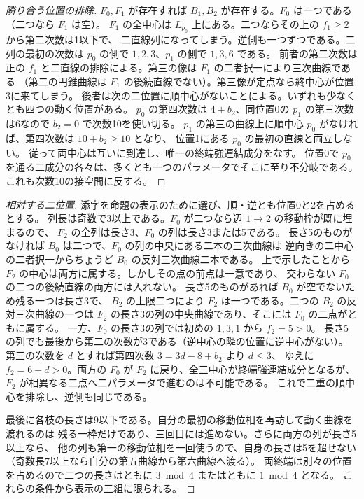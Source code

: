 \begin{proof}[隣り合う位置の排除]
$F_0,F_1$ が存在すれば $B_1,B_2$ が存在する。$F_0$ は一つである（二つなら $F_1$ は空）。
$F_1$ の全中心は $L_{p_0}$ 上にある。二つならその上の $f_1\ge2$ から第二次数は1以下で、
二直線列になってしまう。逆側も一つずつである。二列の最初の次数は
$p_0$ の側で $1,2,3$、$p_1$ の側で $1,3,6$ である。
前者の第二次数は正の $f_1$ と二直線の排除による。第三の像は $F_1$ の二者択一により三次曲線である
（第二の円錐曲線は $F_1$ の後続直線でない）。第三像が定点なら終中心が位置3に来てしまう。
後者は次の二位置に順中心がないことによる。いずれも少なくとも四つの動く位置がある。
$p_0$ の第四次数は $4+b_2$、同位置0の $p_1$ の第三次数は6なので $b_2=0$ で次数10を使い切る。
$p_1$ の第三の曲線上に順中心 $p_0$ がなければ、第四次数は $10+b_2\ge10$ となり、
位置1にある $p_0$ の最初の直線と両立しない。
従って両中心は互いに到達し、唯一の終端強連結成分をなす。
位置0で $p_0$ を通る二成分の各々は、多くとも一つのパラメータでそこに至り不分岐である。
これも次数10の接空間に反する。

\end{proof}
\begin{proof}[相対する二位置]
添字を命題の表示のために選び、順・逆とも位置0と2を占めるとする。
列長は奇数で3以上である。$F_0$ が二つなら辺 $1\to2$ の移動枠が既に埋まるので、
$F_2$ の全列は長さ3、$F_0$ の列は長さ3または5である。
長さ5のものがなければ $B_0$ は二つで、$F_0$ の列の中央にある二本の三次曲線は
逆向きの二中心の二者択一からちょうど $B_0$ の反対三次曲線二本である。
上で示したことから $F_2$ の中心は両方に属する。しかしその点の前点は一意であり、
交わらない $F_0$ の二つの後続直線の両方には入れない。
長さ5のものがあれば $B_0$ が空でないため残る一つは長さ3で、
$B_2$ の上限二つにより $F_2$ は一つである。二つの $B_2$ の反対三次曲線の一つは
$F_2$ の長さ3の列の中央曲線であり、そこには $F_0$ の二点がともに属する。
一方、$F_0$ の長さ3の列では初めの $1,3,1$ から $f_2=5>0$。
長さ5の列でも最後から第二の次数が3である（逆中心の隣の位置に逆中心がない）。
第三の次数を $d$ とすれば第四次数 $3=3d-8+b_2$ より $d\le3$、
ゆえに $f_2=6-d>0$。両方の $F_0$ が $F_2$ に戻り、全三中心が終端強連結成分となるが、
$F_2$ が相異なる二点へ二パラメータで進むのは不可能である。
これで二重の順中心を排除し、逆側も同じである。

最後に各枝の長さは9以下である。自分の最初の移動位相を再訪して動く曲線を渡れるのは
残る一枠だけであり、三回目には進めない。さらに両方の列が長さ5以上なら、
他の列も第一の移動位相を一回使うので、自身の長さは5を超せない
（奇数長7以上なら自分の第五曲線から第六曲線へ渡る）。
両終端は別々の位置を占めるので二つの長さはともに $3\bmod4$ またはともに $1\bmod4$ となる。
これらの条件から表示の三組に限られる。
\end{proof}
